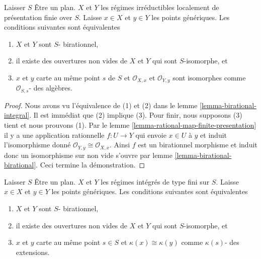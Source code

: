 \begin{lemma}

\label{lemma-criterion-birational-finite-presentation}

Laisser $S$ Être un plan. $X$ et $Y$ les régimes irréductibles localement de présentation finie over $S$. Laisse $x \in X$ et $y \in Y$
les points génériques. Les conditions suivantes sont équivalentes

\begin{enumerate}

\item  $X$ et $Y$ sont $S$- birationnel,
\item il existe des ouvertures non vides de $X$ et $Y$
qui sont $S$-isomorphe, et
\item  $x$ et $y$ carte au même point $s$ de $S$ et
$\mathcal{O}_{X, x}$ et $\mathcal{O}_{Y, y}$ sont isomorphes comme
$\mathcal{O}_{S, s}$- des algèbres.

\end{enumerate}

\end{lemma}

\begin{proof}
Nous avons vu l'équivalence de (1) et (2) dans le lemme \ref{lemma-birational-integral}. Il est immédiat que (2) implique (3). Pour finir, nous supposons (3) tient et nous prouvons (1). Par le lemme \ref{lemma-rational-map-finite-presentation} il y a une application rationnelle $f : U \to Y$ qui envoie $x \in U$ à $y$ et induit l'isomorphisme donné $\mathcal{O}_{Y, y} \cong \mathcal{O}_{X, x}$. Ainsi $f$ est un birationnel morphisme et induit donc un isomorphisme sur non vide s'ouvre par lemme \ref{lemma-birational-birational}. Ceci termine la démonstration.
\end{proof}

\begin{lemma}

\label{lemma-common-open}

Laisser $S$ Être un plan. $X$ et $Y$ les régimes intégrés de type fini sur $S$. Laisse $x \in X$ et $y \in Y$ les points génériques. Les conditions suivantes sont équivalentes

\begin{enumerate}

\item  $X$ et $Y$ sont $S$- birationnel,
\item il existe des ouvertures non vides de $X$ et $Y$ qui sont $S$-isomorphe, et
\item  $x$ et $y$ carte au même point $s \in S$ et
$\kappa(x) \cong \kappa(y)$ comme $\kappa(s)$- des extensions.

\end{enumerate}

\end{lemma}


